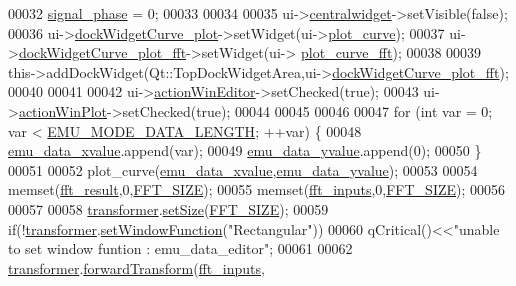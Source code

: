 \begin{DoxyCode}
00032     \hyperlink{a00008_af08de88fdfe283086e3cca97a2965678}{signal\_phase}     = 0;
00033 
00034 
00035     ui->\hyperlink{a00079_afff870ab422d2b873976067827089af1}{centralwidget}->setVisible(\textcolor{keyword}{false});
00036     ui->\hyperlink{a00079_a0edc87fb115fede171c0da1f99000874}{dockWidgetCurve\_plot}->setWidget(ui->\hyperlink{a00079_a1d46308dee8db7e3c99af65f13055479}{plot\_curve});
00037     ui->\hyperlink{a00079_a7474d72172d9e269e8f3cb22bbe2fc86}{dockWidgetCurve\_plot\_fft}->setWidget(ui->
      \hyperlink{a00079_a2bdf46ca3b702151408e6f6bd96b3228}{plot\_curve\_fft});
00038 
00039     this->addDockWidget(Qt::TopDockWidgetArea,ui->\hyperlink{a00079_a7474d72172d9e269e8f3cb22bbe2fc86}{dockWidgetCurve\_plot\_fft});
00040 
00041 
00042     ui->\hyperlink{a00079_aa5d56420958ab4fd1239e29714d75e18}{actionWinEditor}->setChecked(\textcolor{keyword}{true});
00043     ui->\hyperlink{a00079_a0aeb289d8df9db6f4329e9000e44d511}{actionWinPlot}->setChecked(\textcolor{keyword}{true});
00044 
00045 
00046 
00047     \textcolor{keywordflow}{for} (\textcolor{keywordtype}{int} var = 0; var < \hyperlink{a00006_af4c3a8ad94feb4d7bda7f107f34baf41}{EMU\_MODE\_DATA\_LENGTH}; ++var) \{
00048         \hyperlink{a00008_a66d07ec51f26cd9b84994548faa336d6}{emu\_data\_xvalue}.append(var);
00049         \hyperlink{a00008_ad922d05d1e988d84f404c115fe909f72}{emu\_data\_yvalue}.append(0);
00050     \}
00051 
00052     plot\_curve(\hyperlink{a00008_a66d07ec51f26cd9b84994548faa336d6}{emu\_data\_xvalue},\hyperlink{a00008_ad922d05d1e988d84f404c115fe909f72}{emu\_data\_yvalue});
00053 
00054     memset(\hyperlink{a00008_a63b6150bfbba86ba943877a2f547ddd8}{fft\_result},0,\hyperlink{a00094_a636ddc19af00bc87969a07c88331f105}{FFT\_SIZE});
00055     memset(\hyperlink{a00008_a8782fc20094d65d56c04869b9692902e}{fft\_inputs},0,\hyperlink{a00094_a636ddc19af00bc87969a07c88331f105}{FFT\_SIZE});
00056 
00057 
00058     \hyperlink{a00008_a0d6e12337ef942452edea37827e58cd4}{transformer}.\hyperlink{a00054_aab762683a5ed505ed7be906c4340cb07}{setSize}(\hyperlink{a00094_a636ddc19af00bc87969a07c88331f105}{FFT\_SIZE});
00059     \textcolor{keywordflow}{if}(!\hyperlink{a00008_a0d6e12337ef942452edea37827e58cd4}{transformer}.\hyperlink{a00054_a8c8f0a2101aba7f6da70050c7ebdc36c}{setWindowFunction}(\textcolor{stringliteral}{"Rectangular"}))
00060         qCritical()<<\textcolor{stringliteral}{"unable to set window funtion : emu\_data\_editor"};
00061 
00062     \hyperlink{a00008_a0d6e12337ef942452edea37827e58cd4}{transformer}.\hyperlink{a00054_a02bee79c9e9f978ed1fb012eda58ed5d}{forwardTransform}(\hyperlink{a00008_a8782fc20094d65d56c04869b9692902e}{fft\_inputs},

\end{DoxyCode}
